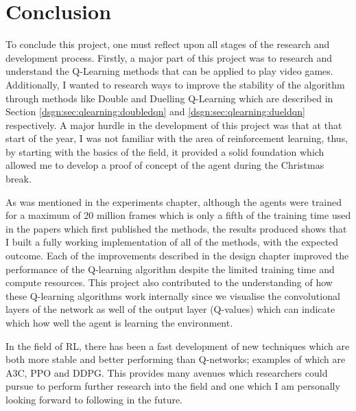\chapter{Conclusion}

To conclude this project, one must reflect upon all stages of the research and development process. Firstly, a major part of this project was to research and understand the Q-Learning methods that can be applied to play video games. Additionally, I wanted to research ways to improve the stability of the algorithm through methods like Double and Duelling Q-Learning which are described in Section \ref{dsgn:sec:qlearning:doubledqn} and \ref{dsgn:sec:qlearning:dueldqn} respectively. A major hurdle in the development of this project was that at that start of the year, I was not familiar with the area of reinforcement learning, thus, by starting with the basics of the field, it provided a solid foundation which allowed me to develop a proof of concept of the agent during the Christmas break.

As was mentioned in the experiments chapter, although the agents were trained for a maximum of 20 million frames which is only a fifth of the training time used in the papers which first published the methods, the results produced shows that I built a fully working implementation of all of the methods, with the expected outcome. Each of the improvements described in the design chapter improved the performance of the Q-learning algorithm despite the limited training time and compute resources. This project also contributed to the understanding of how these Q-learning algorithms work internally since we visualise the convolutional layers of the network as well of the output layer (Q-values) which can indicate which how well the agent is learning the environment.

In the field of RL, there has been a fast development of new techniques which are both more stable and better performing than Q-networks; examples of which are A3C\cite{mnih2016asynchronous}, PPO\cite{schulman2017proximal} and DDPG\cite{lillicrap2015continuous}. This provides many avenues which researchers could pursue to perform further research into the field and one which I am personally looking forward to following in the future.